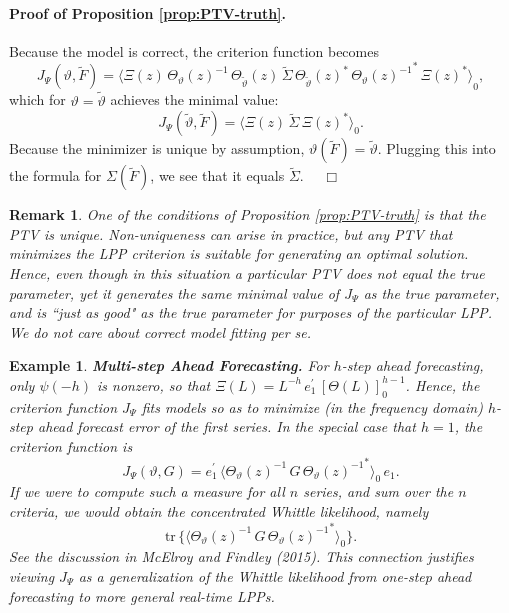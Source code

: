 \documentclass[a4paper]{book}
\newtheorem{Remark}{Remark}
\newtheorem{Example}{Example}
\begin{document}
\paragraph{Proof of Proposition \ref{prop:PTV-truth}.}
 Because the model is correct, the criterion function becomes
\[
  J_{\Psi} (\vartheta, \widetilde{F}) = { \langle \Xi (z) \, { \Theta_{\vartheta   } (z) }^{-1} \, 
   \Theta_{\widetilde{\vartheta}} (z) \, \widetilde{\Sigma} \, 
  {\Theta_{\widetilde{\vartheta}} (z)  }^* \, { { \Theta_{\vartheta  } (z) }^{-1} }^*
 \, { \Xi (z) }^* \rangle }_0,
\]
 which for $\vartheta = \widetilde{\vartheta}$ achieves the minimal value:
\[
  J_{\Psi} (\widetilde{\vartheta}, \widetilde{F})  ={ \langle \Xi (z) \, 
  \widetilde{\Sigma} \,    { \Xi (z) }^* \rangle }_0.
\]
  Because the minimizer is unique by assumption, 
  $\vartheta (\widetilde{F}) = \widetilde{\vartheta} $. 
  Plugging this into the formula
 for $\Sigma (\widetilde{F})$, we see that it equals $\widetilde{\Sigma}$.  $\quad \Box$

\vspace{.5cm}


\begin{Remark} \rm  
\label{rem:PTVunique}
 One of the conditions of Proposition \ref{prop:PTV-truth} is that the PTV is unique.  
 Non-uniqueness can arise in practice, but any PTV that minimizes the LPP criterion 
 is suitable for generating an optimal solution.  Hence, even though in this situation
 a particular PTV does not equal the true parameter, yet it generates the same minimal
 value of $J_{\Psi}$ as the true parameter, and is ``just as good" as the true parameter
 for purposes of the particular LPP.  We do not care about correct model fitting {\it per se}.
\end{Remark}


\begin{Example} {\bf Multi-step Ahead Forecasting.}  \rm
\label{exam:multi-step.fore.3}
 For $h$-step ahead forecasting, only $\psi (-h)$
  is nonzero, so that
 $\Xi (L) =  L^{-h} \,  e_1^{\prime} \, {[ \Theta (L) ]}_0^{ h - 1}$. 
  Hence, the criterion function $J_{\Psi} $ fits models so as to minimize
 (in the frequency domain)  $h$-step ahead forecast error of the first series. 
 In the special case that $h=1$, the criterion function is
\[
 J_{\Psi} (\vartheta, G) =  e_1^{\prime} \, { \langle   { \Theta_{\vartheta   } (z) }^{-1}  \,
  G \, { { \Theta_{\vartheta  } (z) }^{-1} }^*  \rangle }_0 \, e_1.
\]
   If we were to compute such a measure for all $n$ series, and sum over the $n$ criteria, we would obtain the concentrated Whittle 
 likelihood, namely
\[
  \mbox{tr} \, \{  { \langle   { \Theta_{\vartheta   } (z) }^{-1}  \, G \,
  { { \Theta_{\vartheta  } (z) }^{-1} }^*  \rangle }_0 \}.
\]
  See the discussion in McElroy and Findley (2015).  This connection justifies viewing $J_{\Psi}$ as a generalization of the Whittle
 likelihood from one-step ahead forecasting to more general real-time LPPs.
\end{Example}
\end{document}

